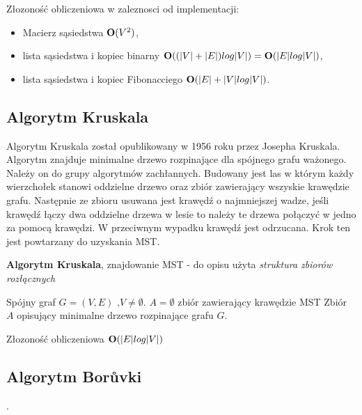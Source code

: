 \documentclass[a4paper, 10pt]{article}
\begin{document}
Złozoność obliczeniowa w zaleznosci od implementacji:

\begin{itemize}
\item{Macierz sąsiedstwa ${\bf O}(V^2)$,} 
\item{lista sąsiedstwa i kopiec binarny ${\bf O}((|V| + |E|) log |V|) = {\bf O}(|E| log |V|)$,}
\item{lista sąsiedstwa i kopiec Fibonacciego  	${\bf O}(|E| + |V| log |V|)$.} 
\end{itemize}


	
	\subsection{Algorytm Kruskala}
	

Algorytm Kruskala został opublikowany w 1956 roku przez Josepha Kruskala. Algorytm znajduje minimalne drzewo rozpinające dla spójnego grafu ważonego. Należy
on do grupy algorytmów zachłannych. Budowany jest las w którym każdy wierzchołek stanowi oddzielne drzewo oraz zbiór zawierający wszyskie krawędzie grafu.
Następnie ze zbioru usuwana jest krawędź o najmniejszej wadze, jeśli krawędź łączy dwa oddzielne drzewa w lesie	to należy te drzewa połączyć w jedno za pomocą
krawędzi. W przeciwnym wypadku krawędź jest odrzucana. Krok ten jest powtarzany do uzyskania MST.

\begin{algorithm}
\caption{{\bf Algorytm Kruskala}, znajdowanie MST - do opisu użyta \textit{struktura zbiorów rozłącznych}}
\begin{algorithmic}[!h]
\REQUIRE Spójny graf $G=(V,E)$ ,$V \neq \emptyset$. 
\ENSURE $A=\emptyset$ zbiór zawierający krawędzie MST
\ENDFOR 
{}
\ENDIF
\ENDFOR 
\RETURN Zbiór $A$ opisujący minimalne drzewo rozpinające grafu $G$.
\end{algorithmic}
\end{algorithm}
\FloatBarrier

Złozoność obliczeniowa ${\bf O}(|E| log |V|)$

	\subsection{Algorytm Borůvki}.
	
\end{document}
